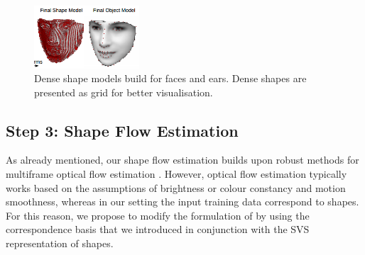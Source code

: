 \begin{figure}[b!]
    \centering
    \includegraphics[width=0.35\textwidth]{resources/models}
    \caption{Dense shape models build for faces and ears. Dense shapes are presented as grid for better visualisation.}
    \label{fig:dense_models}
\end{figure}





{\label{sec:step3}\subsection*{Step 3: Shape Flow Estimation}}



As already mentioned, our shape flow estimation builds upon robust methods for multiframe optical flow estimation \cite{Garg:2013hu}. However, optical flow estimation typically works based on the assumptions of brightness or colour constancy and motion smoothness, whereas in our setting the input training data correspond to shapes. For this reason, we propose to modify the formulation of \cite{Garg:2013hu} by using the correspondence basis that we introduced in conjunction with the SVS representation of shapes.


%


